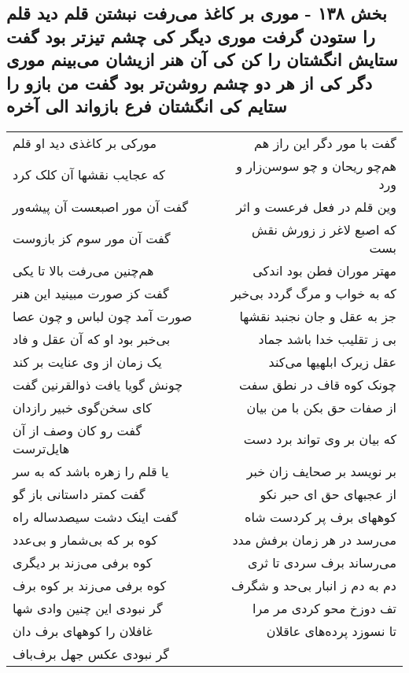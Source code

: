\begin{center}
\section*{بخش ۱۳۸ - موری بر کاغذ می‌رفت نبشتن قلم دید  قلم را ستودن گرفت موری دیگر کی  چشم تیزتر بود گفت ستایش انگشتان  را کن کی آن هنر ازیشان می‌بینم  موری دگر کی از هر دو چشم روشن‌تر بود گفت من بازو را ستایم کی انگشتان فرع بازواند الی آخره}
\label{sec:sh138}
\begin{longtable}{l p{0.5cm} r}
مورکی بر کاغذی دید او قلم
&&
گفت با مور دگر این راز هم
\\
که عجایب نقشها آن کلک کرد
&&
هم‌چو ریحان و چو سوسن‌زار و ورد
\\
گفت آن مور اصبعست آن پیشه‌ور
&&
وین قلم در فعل فرعست و اثر
\\
گفت آن مور سوم کز بازوست
&&
که اصبع لاغر ز زورش نقش بست
\\
هم‌چنین می‌رفت بالا تا یکی
&&
مهتر موران فطن بود اندکی
\\
گفت کز صورت مبینید این هنر
&&
که به خواب و مرگ گردد بی‌خبر
\\
صورت آمد چون لباس و چون عصا
&&
جز به عقل و جان نجنبد نقشها
\\
بی‌خبر بود او که آن عقل و فاد
&&
بی ز تقلیب خدا باشد جماد
\\
یک زمان از وی عنایت بر کند
&&
عقل زیرک ابلهیها می‌کند
\\
چونش گویا یافت ذوالقرنین گفت
&&
چونک کوه قاف در نطق سفت
\\
کای سخن‌گوی خبیر رازدان
&&
از صفات حق بکن با من بیان
\\
گفت رو کان وصف از آن هایل‌ترست
&&
که بیان بر وی تواند برد دست
\\
یا قلم را زهره باشد که به سر
&&
بر نویسد بر صحایف زان خبر
\\
گفت کمتر داستانی باز گو
&&
از عجبهای حق ای حبر نکو
\\
گفت اینک دشت سیصدساله راه
&&
کوههای برف پر کردست شاه
\\
کوه بر که بی‌شمار و بی‌عدد
&&
می‌رسد در هر زمان برفش مدد
\\
کوه برفی می‌زند بر دیگری
&&
می‌رساند برف سردی تا ثری
\\
کوه برفی می‌زند بر کوه برف
&&
دم به دم ز انبار بی‌حد و شگرف
\\
گر نبودی این چنین وادی شها
&&
تف دوزخ محو کردی مر مرا
\\
غافلان را کوههای برف دان
&&
تا نسوزد پرده‌های عاقلان
\\
گر نبودی عکس جهل برف‌باف

\end{longtable}
\end{center}
